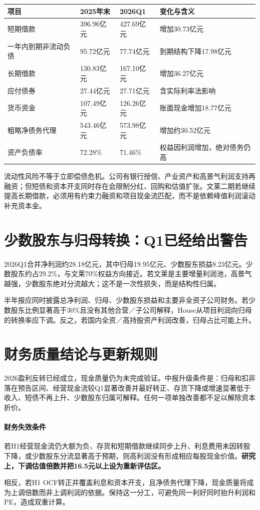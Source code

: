 \begin{exhibitbox}[主要债务与现金桥]
\small
\noindent\begin{tabularx}{\textwidth}{L{3.4cm}R{2.05cm}R{2.05cm}X}
\toprule
\textbf{项目} & \textbf{2025年末} & \textbf{2026Q1} & \textbf{变化与含义} \\
\midrule
短期借款 & 396.96亿元 & 427.69亿元 & 增加30.73亿元 \\
一年内到期非流动负债 & 95.72亿元 & 77.74亿元 & 到期结构下降17.98亿元 \\
长期借款 & 130.83亿元 & 167.10亿元 & 增加36.27亿元 \\
应付债券 & 27.44亿元 & 27.71亿元 & 含实际利率法影响 \\
货币资金 & 107.49亿元 & 126.26亿元 & 账面现金增加18.77亿元 \\
粗略净债务代理 & 543.46亿元 & 573.98亿元 & 增加约30.52亿元 \\
资产负债率 & 72.28\% & 71.46\% & 权益因利润增加，绝对债务仍高 \\
\bottomrule
\end{tabularx}
\end{exhibitbox}

流动性风险不等于立即偿债危机。公司有银行授信、产业资产和高景气利润支持再融资；但短债和资本开支同时存在会限制分红、回购和估值扩张。文莱二期若继续提高长期借款，必须用有约束力融资和项目现金流匹配，而不是依赖峰值利润滚动补充资本金。

\section{少数股东与归母转换：Q1已经给出警告}

2026Q1合并净利润约28.18亿元，其中归母19.95亿元、少数股东损益8.23亿元。少数股东约占29.2\%，与文莱70\%权益方向接近。若文莱是主要增量利润池，高景气越强，少数股东绝对分流越大；这不是一次性损失，而是结构性归属。

半年报应同时披露总净利润、归母、少数股东损益和主要非全资子公司财务。若少数股东比例显著高于30\%且没有其他合营／子公司解释，House从项目利润向归母的转换率应下调。反之，若国内全资／高持股资产利润改善，归母占比可能上升。

\section{财务质量结论与更新规则}

2026盈利反转已经成立，现金质量仍为未完成验证。中报升级条件是：归母和扣非落在预告区间、经营现金流较Q1显著改善并最好转正、存货下降或增速显著低于收入、短债不再上升、少数股东归属可解释。任何一项单独改善都不足以解除资本折价。

\paragraph{财务失效条件} 若H1经营现金流仍大额为负、存货和短期借款继续同步上升、利息费用未因转股下降，或少数股东分流显著高于预期，则高利润没有形成相应每股现金价值。\textbf{研究上，下调估值倍数并把16.5元以上设为重新评估区。}

相反，若H1 OCF转正并覆盖利息和资本开支，且净债务代理下降，现金质量将成为上调倍数而非上调利润的依据。保持这一分工，可避免同一利好同时抬升利润和PE，造成双重计算。
